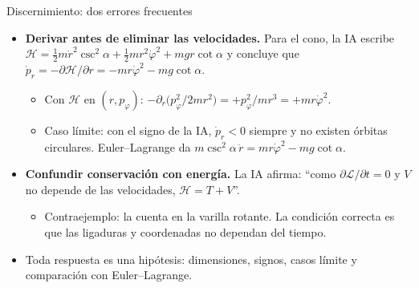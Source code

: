 \documentclass[spanish]{beamer}
\newcommand{\Lag}{\mathcal{L}}               %
\newcommand{\Ham}{\mathcal{H}}               %
\begin{document}
\begin{frame}{\alert{Discernimiento}: dos errores frecuentes}
\begin{itemize}[<+->]
  \item \textbf{Derivar antes de eliminar las velocidades.} Para el cono, la IA escribe
        $\Ham=\tfrac12 m\dot r^2\csc^2\alpha+\tfrac12 mr^2\dot\varphi^2+mgr\cot\alpha$ y
        concluye que $\dot p_r=-\partial\Ham/\partial r=-mr\dot\varphi^2-mg\cot\alpha$.
        \begin{itemize}
          \item Con $\Ham$ en $(r,p_\varphi)$:
                $-\partial_r\big(p_\varphi^2/2mr^2\big)=+p_\varphi^2/mr^3=+mr\dot\varphi^2$.
          \item Caso límite: con el signo de la IA, $\dot p_r<0$ siempre y no existen
                órbitas circulares. Euler--Lagrange da
                $m\csc^2\alpha\,\ddot r=mr\dot\varphi^2-mg\cot\alpha$.
        \end{itemize}
  \item \textbf{Confundir conservación con energía.} La IA afirma: “como
        $\partial\Lag/\partial t=0$ y $V$ no depende de las velocidades, $\Ham=T+V$”.
        \begin{itemize}
          \item Contraejemplo: la cuenta en la varilla rotante. La condición correcta es
                que las ligaduras y coordenadas no dependan del tiempo.
        \end{itemize}
  \item Toda respuesta es una hipótesis: dimensiones, signos, casos límite y comparación
        con Euler--Lagrange.
\end{itemize}
\end{frame}
\end{document}
